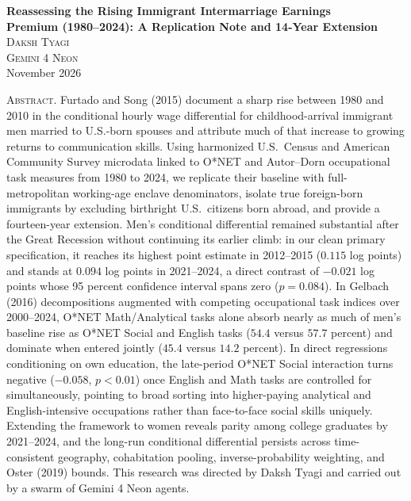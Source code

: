 \documentclass[11pt]{article}
\begin{document}
\begin{center}
  \vspace*{0.2em}
  {\large\bfseries Reassessing the Rising Immigrant Intermarriage Earnings\\[0.15em] Premium (1980--2024): A Replication Note and 14-Year Extension}\\[1.1em]
  {\normalsize\scshape Daksh Tyagi}\\[0.25em]
  {\normalsize\scshape Gemini 4 Neon}\\[0.5em]
  {\small\color{black!65} November 2026}
\end{center}
\vspace{0.9em}

\begin{list}{}{%
  \setlength{\leftmargin}{0.45in}%
  \setlength{\rightmargin}{0.45in}%
  \setlength{\parsep}{0pt}%
  \setlength{\topsep}{0pt}%
  \setlength{\itemsep}{0pt}%
  \setlength{\listparindent}{1.5em}%
}
\item\relax
\small{}%
\noindent\textsc{Abstract.} Furtado and Song (2015) document a sharp rise between 1980 and 2010 in the conditional hourly wage differential for childhood-arrival immigrant men married to U.S.-born spouses and attribute much of that increase to growing returns to communication skills. Using harmonized U.S.\ Census and American Community Survey microdata linked to O*NET and Autor--Dorn occupational task measures from 1980 to 2024, we replicate their baseline with full-metropolitan working-age enclave denominators, isolate true foreign-born immigrants by excluding birthright U.S.\ citizens born abroad, and provide a fourteen-year extension. Men's conditional differential remained substantial after the Great Recession without continuing its earlier climb: in our clean primary specification, it reaches its highest point estimate in 2012--2015 ($0.115$ log points) and stands at $0.094$ log points in 2021--2024, a direct contrast of $-0.021$ log points whose 95 percent confidence interval spans zero ($p = 0.084$). In Gelbach (2016) decompositions augmented with competing occupational task indices over 2000--2024, O*NET Math/Analytical tasks alone absorb nearly as much of men's baseline rise as O*NET Social and English tasks ($54.4$ versus $57.7$ percent) and dominate when entered jointly ($45.4$ versus $14.2$ percent). In direct regressions conditioning on own education, the late-period O*NET Social interaction turns negative ($-0.058$, $p < 0.01$) once English and Math tasks are controlled for simultaneously, pointing to broad sorting into higher-paying analytical and English-intensive occupations rather than face-to-face social skills uniquely. Extending the framework to women reveals parity among college graduates by 2021--2024, and the long-run conditional differential persists across time-consistent geography, cohabitation pooling, inverse-probability weighting, and Oster (2019) bounds. This research was directed by Daksh Tyagi and carried out by a swarm of Gemini 4 Neon agents.


\end{list}
\end{document}

